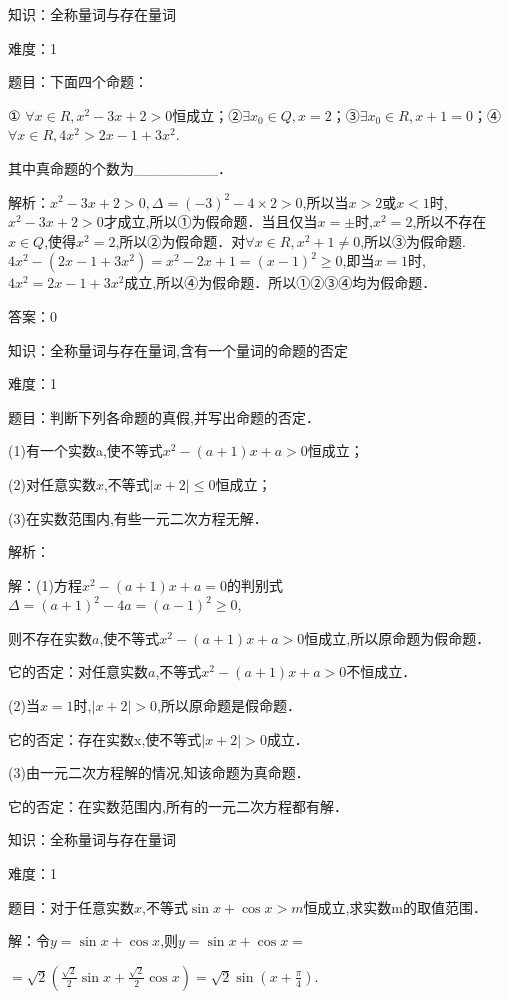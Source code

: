 \documentclass{article} %
\begin{document}
知识：全称量词与存在量词

难度：1

题目：下面四个命题：

① ${\forall }x{\in}R,x^{2}-3x+2>0$恒成立；②${\exists }x_{0}{\in}Q,x=2$；③${\exists }x_{0}{\in}R,x+1=0$；④${\forall }x{\in}R,4x^{2}>2x-1+3x^{2}$.

其中真命题的个数为\_\_\_\_\_\_\_\_．

解析：$x^{2}-3x+2>0,\Delta=(-3)^{2}-4{\times}2>0$,所以当$x>2$或$x<1$时,$x^{2}-3x+2>0$才成立,所以①为假命题．当且仅当$x={\pm}$时,$x^{2}=2$,所以不存在$x{\in}Q$,使得$x^{2}=2$,所以②为假命题．对${\forall }x{\in}R,x^{2}+1{\neq}0$,所以③为假命题.$4x^{2}-(2x-1+3x^{2})=x^{2}-2x+1=(x-1)^{2}{\ge}0$,即当$x=1$时,$4x^{2}=2x-1+3x^{2}$成立,所以④为假命题．所以①②③④均为假命题．

答案：0



知识：全称量词与存在量词,含有一个量词的命题的否定

难度：1

题目：判断下列各命题的真假,并写出命题的否定．

(1)有一个实数a,使不等式$x^{2}-(a+1)x+a>0$恒成立；

(2)对任意实数$x$,不等式$|x+2|\le 0$恒成立；

(3)在实数范围内,有些一元二次方程无解．

解析：

解：(1)方程$x^{2}-(a+1)x+a=0$的判别式$\Delta=(a+1)^{2}-4a=(a-1)^{2}{\ge}0$,

则不存在实数$a$,使不等式$x^{2}-(a+1)x+a>0$恒成立,所以原命题为假命题．

它的否定：对任意实数$a$,不等式$x^{2}-(a+1)x+a>0$不恒成立．

(2)当$x=1$时,$|x+2|>0$,所以原命题是假命题．

它的否定：存在实数x,使不等式$|x+2|>0$成立．

(3)由一元二次方程解的情况,知该命题为真命题．

它的否定：在实数范围内,所有的一元二次方程都有解．



知识：全称量词与存在量词

难度：1

题目：对于任意实数$x$,不等式$\sin x+\cos x>m$恒成立,求实数m的取值范围．

解：令$y=\sin x+\cos x$,则$y=\sin x+\cos x=$

$=\sqrt{2}(\frac{\sqrt{2}}{2}\sin x+\frac{\sqrt{2}}{2}\cos x)=\sqrt{2}\sin(x+\frac{\pi}{4})$.
\end{document}
